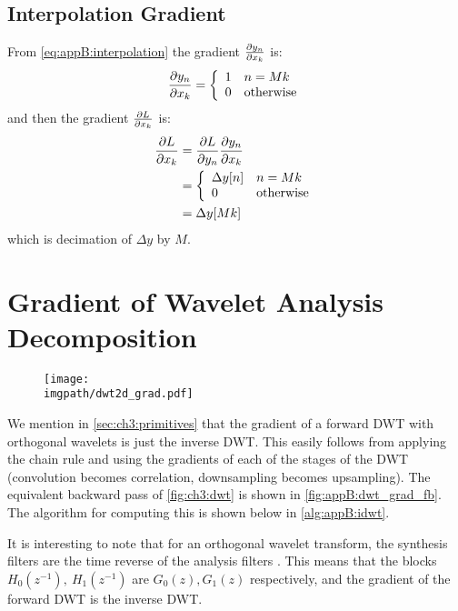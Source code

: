 \subsection{Interpolation Gradient}
From \eqref{eq:appB:interpolation} the gradient $\frac{\partial y_n}{\partial x_k}$ is:
\begin{equation}
  \frac{\partial y_n}{\partial x_k} = \left\{ \begin{array}{ll}
    1 & n = Mk \\
    0 & \text{otherwise}
  \end{array} \right.
\end{equation}
and then the gradient $\frac{\partial L}{\partial x_k}$ is:
\begin{align}
  \frac{\partial L}{\partial x_k} &= \frac{\partial L}{\partial y_n}\frac{\partial y_n}{\partial x_k} \\
                &= \left\{ \begin{array}{ll} 
                \Delta y[n] & n = Mk\\
                  0 & \text{otherwise} 
                \end{array}\right. \\
                &= \Delta y[Mk]
\end{align}
which is decimation of $\Delta y$ by $M$.
 
\section{Gradient of Wavelet Analysis Decomposition}\label{sec:appB:analysis_gradient}
\begin{figure}
  \centering
  \texttt{[image: \\imgpath/dwt2d\_grad.pdf]}
  \label{fig:appB:dwt_grad_fb}
\end{figure}
We mention in \autoref{sec:ch3:primitives} that the gradient of a forward DWT with
orthogonal wavelets is just the inverse DWT. 
This easily follows from applying the chain rule and using the gradients of each of the
stages of the DWT (convolution becomes correlation, downsampling becomes
upsampling). The equivalent backward pass of \autoref{fig:ch3:dwt} is
shown in \autoref{fig:appB:dwt_grad_fb}. The algorithm for computing this is
shown below in \autoref{alg:appB:idwt}.

It is interesting to note that for an orthogonal wavelet transform, the
synthesis filters are the time reverse of the analysis filters \cite[Chapter
3]{vetterli_wavelets_2007}. This means that the blocks $H_0(z^{-1}),\ H_1(z^{-1})$ 
are $G_0(z), G_1(z)$ respectively, and the gradient of the forward DWT is the 
inverse DWT.

